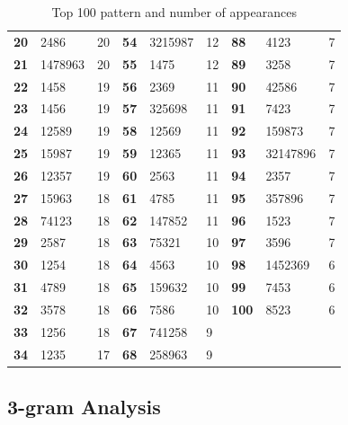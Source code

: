 \begin{table}[H]
\begin{tabular}{l | l l | l | l l  | l | l l }
	      {\bf 20} & 2486       & 20  & {\bf 54} & 3215987  & 12 & {\bf 88} & 4123 & 7 \\ 
	      {\bf 21} & 1478963    & 20  & {\bf 55} & 1475     & 12 & {\bf 89} & 3258 & 7 \\ 
	      {\bf 22} & 1458       & 19  & {\bf 56} & 2369     & 11 & {\bf 90} & 42586 & 7 \\ 
	      {\bf 23} & 1456       & 19  & {\bf 57} & 325698   & 11 & {\bf 91} & 7423 & 7 \\ 
	      {\bf 24} & 12589      & 19  & {\bf 58} & 12569    & 11 & {\bf 92} & 159873 & 7 \\ 
	      {\bf 25} & 15987      & 19  & {\bf 59} & 12365    & 11 & {\bf 93} & 32147896 & 7 \\ 
	      {\bf 26} & 12357      & 19  & {\bf 60} & 2563     & 11 & {\bf 94} & 2357 & 7 \\ 
	      {\bf 27} & 15963      & 18  & {\bf 61} & 4785     & 11 & {\bf 95} & 357896 & 7 \\ 
	      {\bf 28} & 74123      & 18  & {\bf 62} & 147852   & 11 & {\bf 96} & 1523 & 7 \\ 
	      {\bf 29} & 2587       & 18  & {\bf 63} & 75321    & 10 & {\bf 97} & 3596 & 7 \\ 
	      {\bf 30} & 1254       & 18  & {\bf 64} & 4563     & 10 & {\bf 98} & 1452369 & 6 \\ 
	      {\bf 31} & 4789       & 18  & {\bf 65} & 159632   & 10 & {\bf 99} & 7453 & 6 \\ 
	      {\bf 32} & 3578       & 18  & {\bf 66} & 7586     & 10 & {\bf 100} & 8523 & 6 \\ 
	      {\bf 33} & 1256       & 18  & {\bf 67} & 741258   & 9  & & & \\ 
	      {\bf 34} & 1235       & 17  & {\bf 68} & 258963   & 9  & & & \\ \hline
	    \end{tabular} 
	    \caption{Top 100 pattern and number of appearances}
	    \label{tab:top100}
	  \end{table}

	\clearpage
	\subsection{3-gram Analysis} \label{sec:3gram}
		
